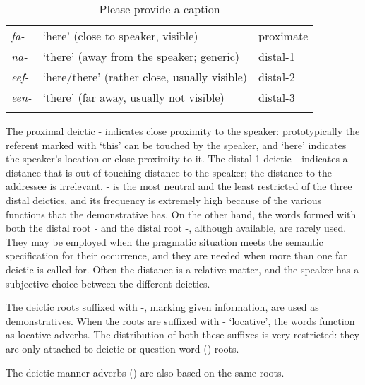 \begin{table}
\caption{Please provide a caption}
 
\begin{tabular}{>{\itshape}lll}
\mytoprule
fa- &`here' (close to speaker, visible) &proximate\\
na- &`there' (away from the speaker; generic) &distal-1\\
eef- &`here/there' (rather close, usually visible) &distal-2\\
een- &`there' (far away, usually not visible) &distal-3\\
\mybottomrule
\end{tabular}
\end{table}


The proximal deictic - indicates close proximity to the speaker: prototypically the referent marked with  `this' can be touched by the speaker, and  `here' indicates the speaker's location or close proximity to it. The distal-1 deictic \textit{-} indicates a distance that is out of touching distance to the speaker; the distance to the addressee is irrelevant. - is the most neutral and the least restricted of the three distal deictics, and its frequency is extremely high because of the various functions that the demonstrative  has. On the other hand, the words formed with both the distal root \textit{\nobreakdash-} and the distal root \nobreakdash-, although available, are rarely used. They may be employed when the pragmatic situation meets the semantic specification for their occurrence, and they are needed when more than one far deictic is called for. Often the distance is a relative matter, and the speaker has a subjective choice between the different deictics.

The deictic roots suffixed with -, marking given information, are used as demonstratives. When the roots are suffixed with - `locative', the words function as locative adverbs. The distribution of both these suffixes is very restricted: they are only attached to deictic or question word () roots.

The deictic manner adverbs () are also based on the same roots.

